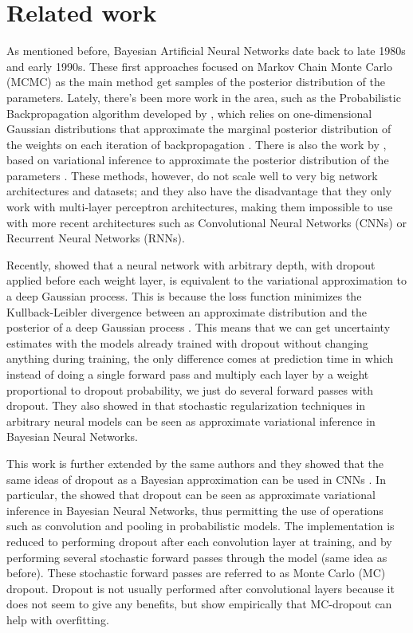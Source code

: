 \section{Related work}

As mentioned before, Bayesian Artificial Neural Networks date back to late 1980s and early 1990s. These first approaches focused on Markov Chain Monte Carlo (MCMC) as the main method get samples of the posterior distribution of the parameters. Lately, there's been more work in the area, such as the Probabilistic Backpropagation algorithm developed by \citeauthor{hernandez2015probabilistic}, which relies on one-dimensional Gaussian distributions that approximate the marginal posterior distribution of the weights on each iteration of backpropagation \cite{hernandez2015probabilistic}. There is also the work by \citeauthor{graves2011practical}, based on variational inference to approximate the posterior distribution of the parameters \cite{graves2011practical}. These methods, however, do not scale well to very big network architectures and datasets; and they also have the disadvantage that they only work with multi-layer perceptron architectures, making them impossible to use with more recent architectures such as Convolutional Neural Networks (CNNs) or Recurrent Neural Networks (RNNs).

Recently, \citeauthor{gal2015dropout1} showed that a neural network with arbitrary depth, with dropout applied before each weight layer, is equivalent to the variational approximation to a deep Gaussian process. This is because the loss function minimizes the Kullback-Leibler divergence between an approximate distribution and the posterior of a deep Gaussian process \cite{gal2015dropout1}. This means that we can get uncertainty estimates with the models already trained with dropout without changing anything during training, the only difference comes at prediction time in which instead of doing a single forward pass and multiply each layer by a weight proportional to dropout probability, we just do several forward passes with dropout. They also showed in \cite{gal2015modern} that stochastic regularization techniques in arbitrary neural models can be seen as approximate variational inference in Bayesian Neural Networks.

This work is further extended by the same authors and they showed that the same ideas of dropout as a Bayesian approximation can be used in CNNs \cite{gal2015bayesian}. In particular, the showed that dropout can be seen as approximate variational inference in Bayesian Neural Networks, thus permitting the use of operations such as convolution and pooling in probabilistic models. The implementation is reduced to performing dropout after each convolution layer at training, and by performing several stochastic forward passes through the model (same idea as before). These stochastic forward passes are referred to as Monte Carlo (MC) dropout. Dropout is not usually performed after convolutional layers because it does not seem to give any benefits, but \citeauthor{gal2015bayesian} show empirically that MC-dropout can help with overfitting.

